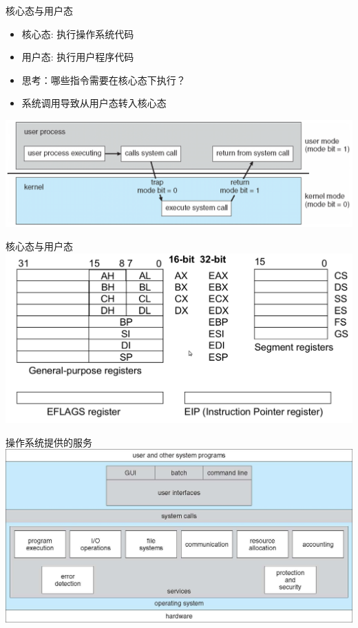 \documentclass[xcolor=svgnames]{beamer}
\begin{document}
\begin{CJK*}{UTF8}{gbsn}
\begin{frame}{核心态与用户态}
\begin{itemize}
\item 核心态: 执行操作系统代码
\item 用户态: 执行用户程序代码
\item 思考：哪些指令需要在核心态下执行？
\item 系统调用导致从用户态转入核心态
\end{itemize}
\includegraphics[width=1.0\textwidth]{mode.png}
\end{frame}

\begin{frame}{核心态与用户态}
\includegraphics[width=1.0\textwidth]{regs.png}
\end{frame}

\begin{frame}{操作系统提供的服务}
\includegraphics[width=1.0\textwidth]{services.jpg}
\end{frame}


\end{CJK*}
\end{document}
